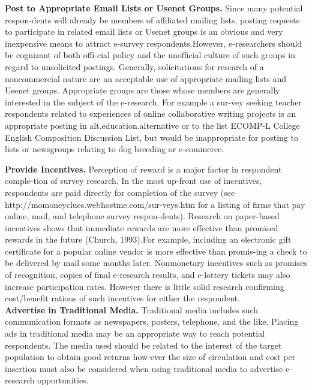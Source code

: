 \documentclass[a4,12pt]{book}
\begin{document}
  \vspace*{0.4cm}

\textbf{Post to Appropriate Email Lists or Usenet Groups.}  \hspace*{0.2cm} Since many potential respon-dents will already be members of affiliated mailing lists, posting requests to participate in related email lists or Usenet groups is an obvious and very inexpensive means to attract e-survey respondents.However, e-researchers should be cognizant of both offi-cial policy and the unofficial culture of such groups in regard to unsolicited postings.
Generally, solicitations for research of a noncommercial nature are an acceptable use of appropriate mailing lists and Usenet groups. Appropriate groups are those whose members are generally interested in the subject of the e-research. For example a sur-vey seeking teacher respondents related to experiences of online collaborative writing projects is an appropriate posting in alt.education.alternative or to the list ECOMP-L College English Composition Discussion List, but would be inappropriate for posting to lists or newsgroups relating to dog breeding or e-commerce.\\

   \vspace*{0.4cm}


\textbf{Provide Incentives.} \hspace*{0.2cm} Perception of reward is a major factor in respondent comple-tion of survey research. In the most up-front use of incentives, respondents are paid directly for completion of the survey (see http://momoneyclues.webhostme.com/sur-veys.htm for a listing of firms that pay online, mail, and telephone survey respon-dents). Research on paper-based incentives shows that immediate rewards are more effective than promised rewards in the future (Church, 1993).For example, including an electronic gift certificate for a popular online vendor is more  effective than promis-ing a check to be delivered by mail some months later. Nonmonetary incentives such as promises of recognition, copies of final e-research results, and e-lottery tickets may also increase participation rates. However there is little solid research confirming cost/benefit rations of such incentives for either the respondent.\\

 \vspace*{0.3cm}
\textbf{Advertise in Traditional Media.}  \hspace*{0.2cm} Traditional media includes such communication formats as newspapers, posters, telephone, and the like. Placing ads in traditional media may be an appropriate way to reach potential respondents. The media used should be related to the interest of the target population to obtain good returns how-ever the size of circulation and cost per insertion must also be considered when using traditional media to advertise e-research opportunities.\\
\end{document}
